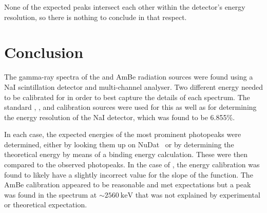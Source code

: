 \documentclass[11pt]{article}
\numberwithin{equation}{section}
\numberwithin{figure}{section}
\numberwithin{table}{section}
\begin{document}
None of the expected peaks intersect each other within the detector's energy resolution, so there is nothing to conclude in that respect. 

\section{Conclusion}\label{sec:Conclusion}
The gamma-ray spectra of the  and AmBe radiation sources were found using a NaI scintillation detector and multi-channel analyser. Two different energy needed to be calibrated for in order to best capture the details of each spectrum. The standard , , and  calibration sources were used for this as well as for determining the energy resolution of the NaI detector, which was found to be 6.855\%. 

In each case, the expected energies of the most prominent photopeaks were determined, either by looking them up on NuDat~\cite{nudat} or by determining the theoretical energy by means of a binding energy calculation. These were then compared to the observed photopeaks. In the case of , the energy calibration was found to likely have a slightly incorrect value for the slope of the function. The AmBe calibration appeared to be reasonable and met expectations but a peak was found in the spectrum at $\sim\SI{2560}{\kilo\electronvolt}$ that was not explained by experimental or theoretical expectation. 

\printbibliography
\end{document}
